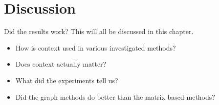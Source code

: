 \section{Discussion}
Did the results work? This will all be discussed in this chapter.

\begin{itemize}
    \item How is context used in various investigated methods?
    \item Does context actually matter?
    \item What did the experiments tell us?
    \item Did the graph methods do better than the matrix based methods?
\end{itemize}